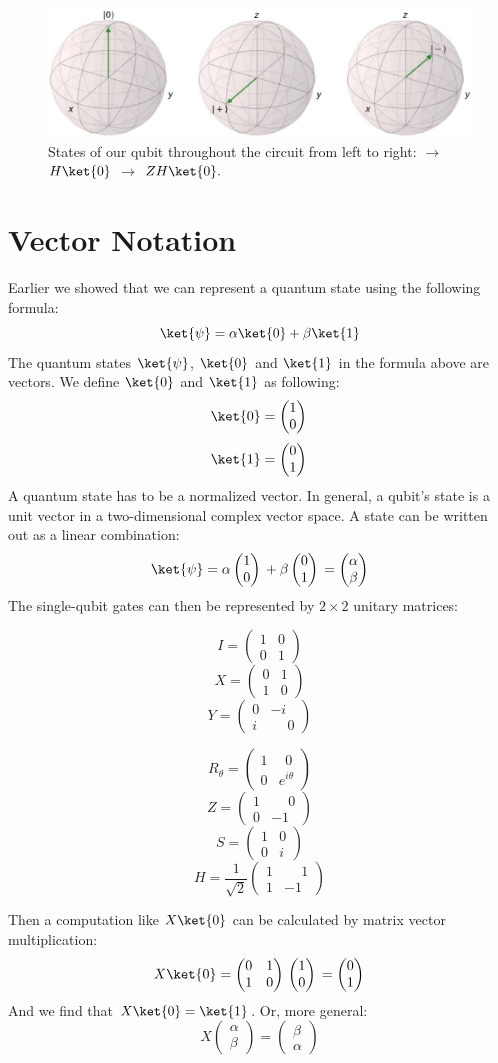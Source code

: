 \documentclass[11pt, notitlepage]{report}
\newcommand{\igate}{
  \begin{pmatrix}
  1 & 0 \\
  0 & 1
  \end{pmatrix}
}
\newcommand{\xgate}{
  \begin{pmatrix}
  0 & 1 \\
  1 & 0
  \end{pmatrix}
}
\newcommand{\ygate}{
  \begin{pmatrix}
  0 & -i \\
  i & \phantom{-}0
  \end{pmatrix}
}
\newcommand{\zgate}{
  \begin{pmatrix}
  1 & \phantom{-}0 \\
  0 & -1
  \end{pmatrix}
}
\newcommand{\hgate}{
  \dfrac{1}{\sqrt2}
  \begin{pmatrix}
  1 & \phantom{-}1 \\
  1 & -1
  \end{pmatrix}
}
\newcommand{\sgate}{
  \begin{pmatrix}
  1 & 0 \\
  0 & i
  \end{pmatrix}
}
\newcommand{\phasegate}{
  \begin{pmatrix}
  1 & \phantom{e}0 \\
  0 & e^{i\theta}
  \end{pmatrix}
}
\newcommand{\qstatezero}{
  \begin{pmatrix}1 \\ 0\end{pmatrix}
}
\newcommand{\qstateone}{
  \begin{pmatrix}0 \\ 1\end{pmatrix}
}
\begin{document}
\begin{figure}[ht]
  \centering
  \includegraphics[scale=0.37]{images/simple_circuit.eps}
  \caption{States of our qubit throughout the circuit from left to right:  $\rightarrow$ $H\ket{0}$ $\rightarrow$ $ZH\ket{0}.$}
  \label{fig:gate_rotations}
\end{figure}

\section{Vector Notation} \label{sec:matrix_notation}
Earlier we showed that we can represent a quantum state using the following formula:
\[\ket{\psi} = \alpha\ket{0} + \beta\ket{1}\]
The quantum states $\ket{\psi}$, $\ket{0}$ and $\ket{1}$ in the formula above are vectors. We define $\ket{0}$ and $\ket{1}$ as following:
\[\ket{0} = \qstatezero{}\]
\[\ket{1} = \qstateone{}\]
A quantum state has to be a normalized vector. In general, a qubit's state is a unit vector in a two-dimensional complex vector space. A state can be written out as a linear combination:
\[
  \ket{\psi} = \alpha\qstatezero{} + \beta\qstateone{} =
\begin{pmatrix}\alpha \\ \beta\end{pmatrix}
\]
The single-qubit gates can then be represented by $2 \times 2$ unitary matrices:
\setlength\multicolsep{0pt}
\begin{multicols}{3}
  \[
    I = \igate{}
  \]
  \vfill
  \[
    X = \xgate{}
  \]
  \vfill
  \[
    Y = \ygate{}
  \]
\end{multicols}

\begin{multicols}{4}
  \[
    R_\theta = \phasegate{}
  \]
  \vfill
  \[
    Z = \zgate{}
  \]
  \vfill
  \[
    S = \sgate{}
  \]
    \vfill
  \[
    H = \hgate{}
  \]
\end{multicols}
\bigskip
\noindent
Then a computation like $X\ket{0}$ can be calculated by matrix vector multiplication:
\[
X\ket{0} = \xgate{} \qstatezero{} = \qstateone{}
\]
And we find that $X\ket{0} = \ket{1}$. Or, more general:
\[
  X\begin{pmatrix}\alpha \\ \beta\end{pmatrix} = \begin{pmatrix}\beta \\ \alpha\end{pmatrix}
\]
\end{document}
